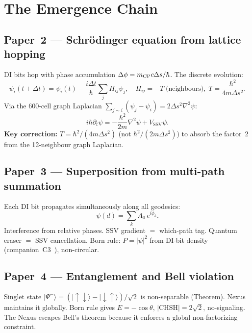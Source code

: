 \documentclass[11pt,a4paper]{article}
\newcommand{\SSV}{\mathrm{SSV}}
\newcommand{\ket}[1]{|#1\rangle}
\begin{document}
\section{The Emergence Chain}

\subsection{Paper~2 --- Schr\"{o}dinger equation from lattice
hopping~\cite{cpp2040a}}

DI bits hop with phase accumulation $\Delta\phi = m_{\rm CP}c\Delta s/\hbar$.
The discrete evolution:
\begin{equation}
\psi_i(t+\Delta t) = \psi_i(t)
- \frac{i\Delta t}{\hbar}\sum_j H_{ij}\psi_j,
\quad H_{ij} = -T\;\text{(neighbours)},\;
T = \frac{\hbar^2}{4m\Delta s^2}.
\end{equation}
Via the 600-cell graph Laplacian
$\sum_{j\sim i}(\psi_j-\psi_i) = 2\Delta s^2\nabla^2\psi$:
\begin{equation}
i\hbar\partial_t\psi = -\frac{\hbar^2}{2m}\nabla^2\psi + V_{\SSV}\psi.
\end{equation}
\textbf{Key correction:} $T = \hbar^2/(4m\Delta s^2)$ (not $\hbar^2/(2m\Delta s^2)$)
to absorb the factor~2 from the 12-neighbour graph Laplacian.

\subsection{Paper~3 --- Superposition from multi-path
summation~\cite{cpp2040b_super}}

Each DI bit propagates simultaneously along all geodesics:
\begin{equation}
\psi(d) = \sum_k A_0\,e^{i\phi_k}.
\end{equation}
Interference from relative phases.  SSV gradient $=$ which-path tag.
Quantum eraser $=$ SSV cancellation.  Born rule: $P = |\psi|^2$
from DI-bit density (companion~C3~\cite{abshier2026c3}), non-circular.

\subsection{Paper~4 --- Entanglement and Bell violation~\cite{cpp2040c}}

Singlet state $\ket{\Psi^-} = (\ket{\uparrow\downarrow} -
\ket{\downarrow\uparrow})/\sqrt{2}$ is non-separable (Theorem).
Nexus maintains it globally.  Born rule gives $E = -\cos\theta$,
$|\mathrm{CHSH}| = 2\sqrt{2}$, no-signaling.  The Nexus escapes
Bell's theorem because it enforces a global non-factorizing constraint.
\end{document}
